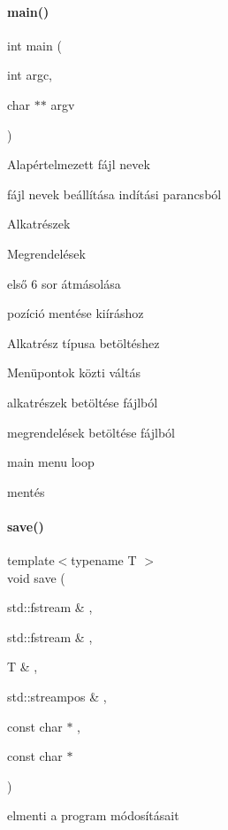 \paragraph{\texorpdfstring{main()}{main()}}
{\footnotesize\ttfamily int main (\begin{DoxyParamCaption}\item[{int}]{argc,  }\item[{char $\ast$$\ast$}]{argv }\end{DoxyParamCaption})}

Alapértelmezett fájl nevek

fájl nevek beállítása indítási parancsból

Alkatrészek

Megrendelések

első 6 sor átmásolása

pozíció mentése kiíráshoz

Alkatrész típusa betöltéshez

Menüpontok közti váltás

alkatrészek betöltése fájlból

megrendelések betöltése fájlból

main menu loop

mentés \mbox{\label{main_8h_a0060785675592b854caa528edb88d690}} 
\paragraph{\texorpdfstring{save()}{save()}}
{\footnotesize\ttfamily template$<$typename T $>$ \\
void save (\begin{DoxyParamCaption}\item[{std\+::fstream \&}]{,  }\item[{std\+::fstream \&}]{,  }\item[{T \&}]{,  }\item[{std\+::streampos \&}]{,  }\item[{const char $\ast$}]{,  }\item[{const char $\ast$}]{ }\end{DoxyParamCaption})}



elmenti a program módosításait 

